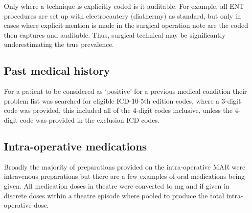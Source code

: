 \documentclass[
  letterpaper,
  DIV=11,
  numbers=noendperiod]{scrreprt}
\newcounter{none} %
\begin{document}
Only where a technique is explicitly coded is it auditable. For example,
all ENT procedures are set up with electrocautery (diathermy) as
standard, but only in cases where explicit mention is made in the
surgical operation note are the coded then captures and auditable. Thus,
surgical technical may be significantly underestimating the true
prevalence.

\subsection{Past medical history}\label{sec-sm-data-spec-pmh}

For a patient to be considered as `positive' for a previous medical
condition their problem list was searched for eligible ICD-10-5th
edition codes, where a 3-digit code was provided, this included all of
the 4-digit codes inclusive, unless the 4-digit code was provided in the
exclusion ICD codes.

\begin{stbl}


\caption{\label{stbl-pmh-criteria}\textbf{Eligibility for past medical
history filtering on ICD10 codes.}}

\end{stbl}%

\subsection{Intra-operative
medications}\label{sec-sm-data-spec-intra-op-meds}

Broadly the majority of preparations provided on the intra-operative MAR
were intravenous preparations but there are a few examples of oral
medications being given. All medication doses in theatre were converted
to mg and if given in discrete doses within a theatre episode where
pooled to produce the total intra-operative dose.
\end{document}
